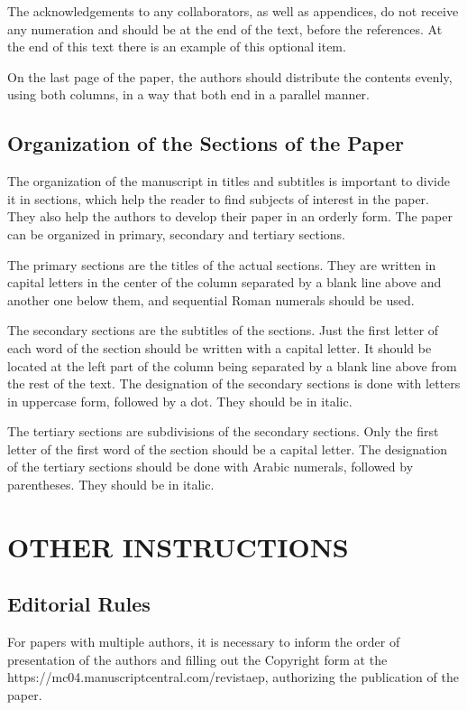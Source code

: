 \documentclass[english]{sobraep}
\begin{document}
The acknowledgements to any collaborators, as well as appendices, do not receive any numeration and should be at the end of the text, before the references. At the end of this text there is an example of this optional item.

On the last page of the paper, the authors should distribute the contents evenly, using both columns, in a way that both end in a parallel manner.

\subsection{Organization of the Sections of the Paper}

The organization of the manuscript in titles and subtitles is important to divide it in sections, which help the reader to find subjects of interest in the paper. They also help the authors to develop their paper in an orderly form. The paper can be organized in primary, secondary and tertiary sections.

The primary sections are the titles of the actual sections. They are written in capital letters in the center of the column separated by a blank line above and another one below them, and sequential Roman numerals should be used.

The secondary sections are the subtitles of the sections. Just the first letter of each word of the section should be written with a capital letter. It should be located at the left part of the column being separated by a blank line above from the rest of the text. The designation of the secondary sections is done with letters in uppercase form, followed by a dot. They should be in italic.

The tertiary sections are subdivisions of the secondary sections. Only the first letter of the first word of the section should be a capital letter. The designation of the tertiary sections should be done with Arabic numerals, followed by parentheses. They should be in italic.

\section{OTHER INSTRUCTIONS}

\subsection{Editorial Rules}

For papers with multiple authors, it is necessary to inform the order of presentation of the authors and filling out the Copyright form at the https://mc04.manuscriptcentral.com/revistaep, authorizing the publication of the paper.
\end{document}
